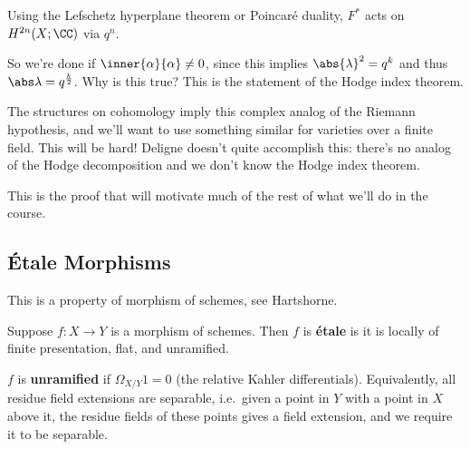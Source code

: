 \begin{exercise}[?]

Using the Lefschetz hyperplane theorem or Poincaré duality, \(F^*\) acts
on \(H^{2n}(X; \CC)\) via \(q^n\).

\end{exercise}

So we're done if \(\inner{\alpha}{\alpha} \neq 0\), since this implies
\(\abs{\lambda}^2 = q^k\) and thus \(\abs \lambda = q^{k\over 2}\). Why
is this true? This is the statement of the Hodge index theorem.

\begin{remark}[Slogan]

The structures on cohomology imply this complex analog of the Riemann
hypothesis, and we'll want to use something similar for varieties over a
finite field. This will be hard! Deligne doesn't quite accomplish this:
there's no analog of the Hodge decomposition and we don't know the Hodge
index theorem.

\end{remark}

This is the proof that will motivate much of the rest of what we'll do
in the course.

\hypertarget{uxe9tale-morphisms}{%
\subsection{Étale Morphisms}\label{uxe9tale-morphisms}}

This is a property of morphism of schemes, see Hartshorne.

\begin{definition}

Suppose \(f:X\to Y\) is a morphism of schemes. Then \(f\) is
\textbf{étale} is it is locally of finite presentation, flat, and
unramified.

\end{definition}

\begin{definition}[Unramified]

\(f\) is \textbf{unramified} if \(\Omega_{X/Y}1 = 0\) (the relative
Kahler differentials). Equivalently, all residue field extensions are
separable, i.e.~given a point in \(Y\) with a point in \(X\) above it,
the residue fields of these points gives a field extension, and we
require it to be separable.

\end{definition}

